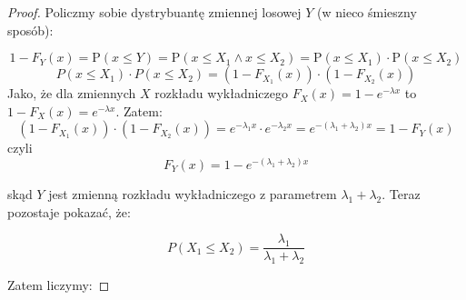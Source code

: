 \begin{proof}
    Policzmy sobie dystrybuantę zmiennej losowej \(Y\) (w nieco śmieszny sposób): 
    
    \[ 
        1 - F_Y(x) = \mathrm{P}(x \leq Y) = \mathrm{P}(x \leq X_1 \land x \leq X_2) = \mathrm{P}(x \leq X_1) \cdot \mathrm{P}(x \leq X_2) 
    \]
    \[ 
        P(x \leq X_1) \cdot P(x \leq X_2) = (1 - F_{X_1}(x)) \cdot (1 - F_{X_2}(x))
    \]
    Jako, że dla zmiennych \(X\) rozkładu wykładniczego \(F_{X}(x) = 1 - e^{- \lambda x}\) to \(1 - F_{X}(x) = e^{-\lambda x}\). Zatem:
    \[
    (1 - F_{X_1}(x)) \cdot (1 - F_{X_2}(x)) = e^{-\lambda_1 x} \cdot e^{-\lambda_2 x} = e^{-(\lambda_1 + \lambda_2)x} = 1 - F_Y(x)
    \]
    czyli 
    \[ 
        F_Y(x) = 1 - e^{-(\lambda_1 + \lambda_2)x}
    \]
    
    skąd \(Y\) jest zmienną rozkładu wykładniczego z parametrem \( \lambda_1 + \lambda_2\). Teraz pozostaje pokazać, że:
    
    \[
        P(X_1 \leq X_2) = \frac{\lambda_1}{\lambda_1 + \lambda_2}
    \]
    
    Zatem liczymy:
    

\end{proof}
